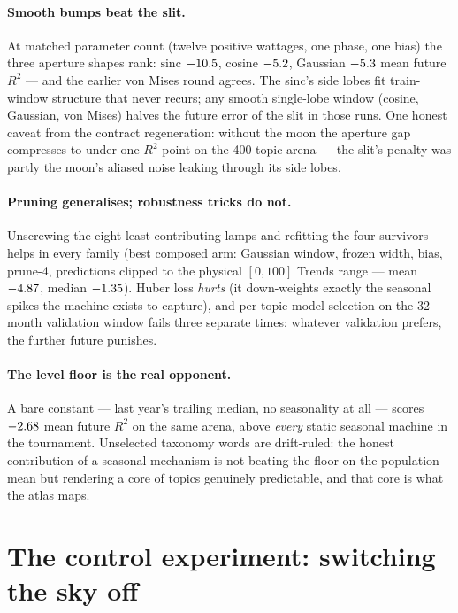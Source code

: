 \documentclass[11pt]{artaquest}
\begin{document}
\paragraph{Smooth bumps beat the slit.} At matched parameter count (twelve positive wattages, one
phase, one bias) the three aperture shapes rank:
$\mathrm{sinc}$ $-10.5$, cosine $-5.2$, Gaussian $-5.3$ mean future $R^2$ --- and the
earlier von Mises round agrees. The sinc's side lobes fit train-window structure that never
recurs; any smooth single-lobe window (cosine, Gaussian, von Mises) halves the future error of
the slit in those runs. One honest caveat from the contract regeneration: without the moon the
aperture gap compresses to under one $R^2$ point on the 400-topic arena --- the slit's penalty
was partly the moon's aliased noise leaking through its side lobes.

\paragraph{Pruning generalises; robustness tricks do not.} Unscrewing the eight
least-contributing lamps and refitting the four survivors helps in every family (best composed
arm: Gaussian window, frozen width, bias, prune-4, predictions clipped to the physical
$[0,100]$ Trends range --- mean $-4.87$, median $-1.35$). Huber loss \emph{hurts} (it
down-weights exactly the seasonal spikes the machine exists to capture), and per-topic model
selection on the 32-month validation window fails three separate times: whatever validation
prefers, the further future punishes.

\paragraph{The level floor is the real opponent.} A bare constant --- last year's trailing median,
no seasonality at all --- scores $-2.68$ mean future $R^2$ on the same arena, above
\emph{every} static seasonal machine in the tournament. Unselected taxonomy words are
drift-ruled: the honest contribution of a seasonal mechanism is not beating the floor on the
population mean but rendering a core of topics genuinely predictable, and that core is what the
atlas maps.

\section{The control experiment: switching the sky off}
\end{document}

